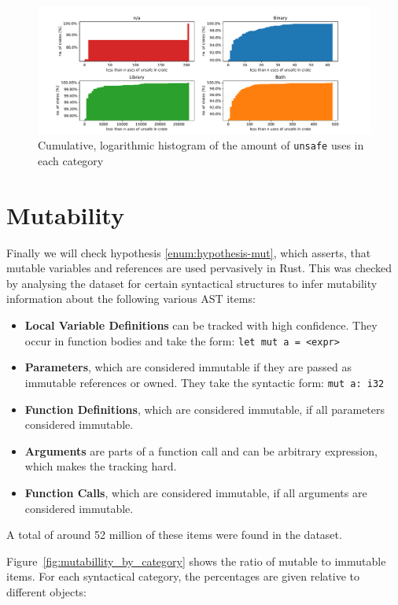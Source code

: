 \documentclass{book}
\newcommand{\code}[1]{\texttt{#1}}
\theoremstyle{definition}
\begin{document}
\begin{figure}[h]
	\centering
	\includegraphics[width=0.99\linewidth, clip, trim={0.2cm 0.2cm 0.2cm 0.2cm}]{../unsafe_counts_by_crate_type.pdf}
	\caption{Cumulative, logarithmic histogram of the amount of \code{unsafe} uses in each category}
	\label{fig:unsafe-hist}
\end{figure}


\section{Mutability}

Finally we will check hypothesis \ref{enum:hypothesis-mut}, which asserts, that mutable variables and references are used pervasively in Rust.
This was checked by analysing the dataset for certain syntactical structures to infer mutability information about the following various AST items:
\begin{itemize}
	\item \textbf{Local Variable Definitions} can be tracked with high confidence. They occur in function bodies and take the form: \code{let mut a = <expr>}
	\item \textbf{Parameters}, which are considered immutable if they are passed as immutable references or owned. They take the syntactic form: \code{mut a: i32}
	\item \textbf{Function Definitions}, which are considered immutable, if all parameters considered immutable.
	\item \textbf{Arguments} are parts of a function call and can be arbitrary expression, which makes the tracking hard.
	\item \textbf{Function Calls}, which are considered immutable, if all arguments are considered immutable.
\end{itemize}

A total of around 52 million of these items were found in the dataset.

Figure~\ref{fig:mutabillity_by_category} shows the ratio of mutable to immutable items. For each syntactical category, the percentages are given relative to different objects:
\end{document}
